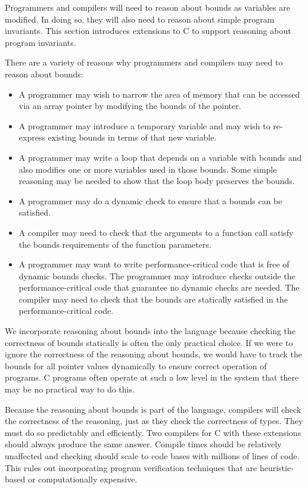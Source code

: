 \documentclass[]{article}
\begin{document}
Programmers and compilers will need to reason about bounds as variables
are modified. In doing so, they will also need to reason about simple
program invariants. This section introduces extensions to C to support
reasoning about program invariants.

There are a variety of reasons why programmers and compilers may need to
reason about bounds:

\begin{itemize}
\item
  A programmer may wish to narrow the area of memory that can be
  accessed via an array pointer by modifying the bounds of the pointer.
\item
  A programmer may introduce a temporary variable and may wish to
  re-express existing bounds in terms of that new variable.
\item
  A programmer may write a loop that depends on a variable with bounds
  and also modifies one or more variables used in those bounds. Some
  simple reasoning may be needed to show that the loop body preserves
  the bounds.
\item
  A programmer may do a dynamic check to ensure that a bounds can be
  satisfied.
\item
  A compiler may need to check that the arguments to a function call
  satisfy the bounds requirements of the function parameters.
\item
  A programmer may want to write performance-critical code that is free
  of dynamic bounds checks. The programmer may introduce checks outside
  the performance-critical code that guarantee no dynamic checks are
  needed. The compiler may need to check that the bounds are statically
  satisfied in the performance-critical code.
\end{itemize}

We incorporate reasoning about bounds into the language because checking
the correctness of bounds statically is often the only practical choice.
If we were to ignore the correctness of the reasoning about bounds, we
would have to track the bounds for all pointer values dynamically to
ensure correct operation of programs. C programs often operate at such a
low level in the system that there may be no practical way to do this.

Because the reasoning about bounds is part of the language, compilers
will check the correctness of the reasoning, just as they check the
correctness of types. They must do so predictably and efficiently. Two
compilers for C with these extensions should always produce the same
answer. Compile times should be relatively unaffected and checking
should scale to code bases with millions of lines of code. This rules
out incorporating program verification techniques that are
heuristic-based or computationally expensive.
\end{document}
